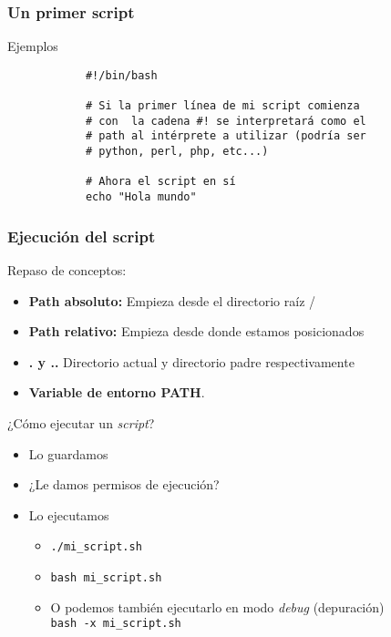 \begin{frame}[fragile]
	\frametitle{Un primer script}
	\begin{block}{Ejemplos}
		\begin{lstlisting}
			#!/bin/bash
			 
			# Si la primer línea de mi script comienza
			# con  la cadena #! se interpretará como el
			# path al intérprete a utilizar (podría ser
			# python, perl, php, etc...)‏

			# Ahora el script en sí
			echo "Hola mundo"
		\end{lstlisting}
	\end{block}
\end{frame}

\begin{frame}
	\frametitle{Ejecución del script}
	Repaso de conceptos:
	\begin{itemize}
		\item \textbf{Path absoluto:} Empieza desde el directorio raíz /
		\item \textbf{Path relativo:} Empieza desde donde estamos posicionados
		\item \textbf{. y ..} Directorio actual y directorio padre respectivamente
		\item \textbf{Variable de entorno PATH}.
	\end{itemize}

    \pause

    ¿Cómo ejecutar un \textit{script}?
	\begin{itemize}[<+->]
		\item Lo guardamos
		\item ¿Le damos permisos de ejecución? 
		\item Lo ejecutamos 
		\begin{itemize}
			\item \texttt{./mi\_script.sh}
			\item \texttt{bash mi\_script.sh}
			\item O podemos también ejecutarlo en modo \textit{debug} (depuración)\\
			\texttt{bash -x mi\_script.sh}
		\end{itemize}
	\end{itemize}
\end{frame}

